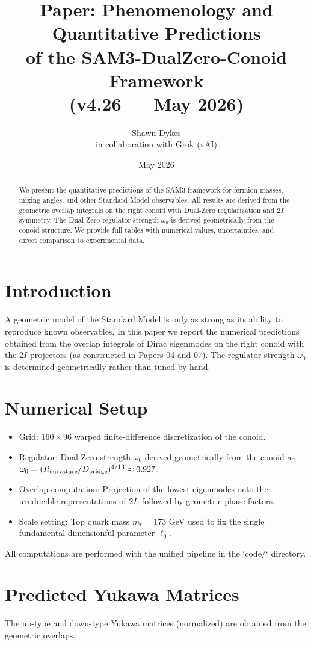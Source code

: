 \documentclass[11pt,a4paper]{article}
\title{\textbf{Paper: Phenomenology and Quantitative Predictions}\\
of the SAM3-DualZero-Conoid Framework \\ (v4.26 — May 2026)}
\author{Shawn Dykes \\ \small in collaboration with Grok (xAI)}
\date{May 2026}
\begin{document}
\maketitle

\begin{abstract}
We present the quantitative predictions of the SAM3 framework for fermion masses, mixing angles, and other Standard Model observables. All results are derived from the geometric overlap integrals on the right conoid with Dual-Zero regularization and \(2I\) symmetry. The Dual-Zero regulator strength \(\omega_0\) is derived geometrically from the conoid structure. We provide full tables with numerical values, uncertainties, and direct comparison to experimental data.
\end{abstract}

\section{Introduction}
A geometric model of the Standard Model is only as strong as its ability to reproduce known observables. In this paper we report the numerical predictions obtained from the overlap integrals of Dirac eigenmodes on the right conoid with the \(2I\) projectors (as constructed in Papers 04 and 07). The regulator strength \(\omega_0\) is determined geometrically rather than tuned by hand.

\section{Numerical Setup}
\begin{itemize}
    \item Grid: \(160 \times 96\) warped finite-difference discretization of the conoid.
    \item Regulator: Dual-Zero strength \(\omega_0\) derived geometrically from the conoid as \(\omega_0 = (R_{\rm curvature}/D_{\rm bridge})^{4/13} \approx 0.927\).
    \item Overlap computation: Projection of the lowest eigenmodes onto the irreducible representations of \(2I\), followed by geometric phase factors.
    \item Scale setting: Top quark mass \(m_t = 173\) GeV used to fix the single fundamental dimensionful parameter \(\ell_0\).
\end{itemize}
All computations are performed with the unified pipeline in the `code/` directory.

\section{Predicted Yukawa Matrices}
The up-type and down-type Yukawa matrices (normalized) are obtained from the geometric overlaps.
\end{document}

